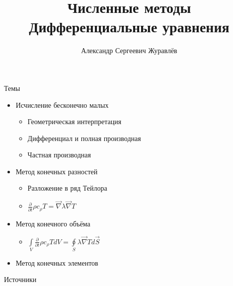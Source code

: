 \documentclass[12pt]{beamer}
\author{Александр Сергеевич Журавлёв}
\title[Дифференциальные уравнения]{Численные методы \\ Дифференциальные уравнения}
\institute{Физико-технический институт}
\begin{document}
\begin{frame}
    \titlepage
\end{frame}


\begin{frame}{Темы}
    \begin{itemize}
        \item Исчисление бесконечно малых
            \begin{itemize}
                \item Геометрическая интерпретация
                \item Дифференциал и полная производная                
                \item Частная производная
            \end{itemize}
        \item Метод конечных разностей
            \begin{itemize}
                \item Разложение в ряд Тейлора        
                \item $\frac{\partial}{\partial t} \rho c_{\rho} T = \vec{\nabla}  \lambda \vec{\nabla} T$      
            \end{itemize}
        \item Метод конечного объёма
            \begin{itemize}
                \item $\int \limits_{V} \frac{\partial}{\partial t} \rho c_{\rho} T dV = \oint \limits_{S}  \lambda \vec{\nabla} T d \vec{S}$               
            \end{itemize}
        \item Метод конечных элементов          
    \end{itemize}
\end{frame}

\begin{frame}{Источники}
\end{frame}
\end{document}
